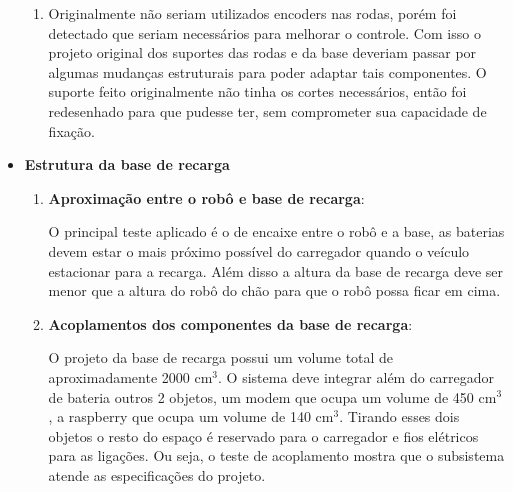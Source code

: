 \begin{itemize}
\begin{enumerate}
   			\item Originalmente não seriam utilizados encoders nas rodas, porém foi detectado que seriam necessários para melhorar o controle. Com isso o projeto original dos suportes das rodas e da base deveriam passar por algumas mudanças estruturais para poder adaptar tais componentes. O suporte feito originalmente não tinha os cortes necessários, então foi redesenhado para que pudesse ter, sem comprometer sua capacidade de fixação.

   		\end{enumerate}

   		\item \textbf{Estrutura da base de recarga}
   			\begin{enumerate}
   				\item \textbf{Aproximação entre o robô e base de recarga}:

   					O principal teste aplicado é o de encaixe entre o robô e a base, as baterias devem estar o mais próximo possível do carregador quando o veículo estacionar para a recarga. Além disso a altura da base de recarga deve ser menor que a altura do robô do chão para que o robô possa ficar em cima.


   				\item \textbf{Acoplamentos dos componentes da base de recarga}:

   					O projeto da base de recarga possui um volume total de aproximadamente 2000 cm$^3$. O sistema deve integrar além do carregador de bateria outros 2 objetos, um modem que ocupa um volume de 450 cm$^3$, a raspberry que ocupa um volume de 140 cm$^3$. Tirando esses dois objetos o resto do espaço é reservado para o carregador e fios elétricos para as ligações. Ou seja, o teste de acoplamento mostra que o subsistema atende as especificações do projeto.

   			\end{enumerate}


	\end{itemize}


